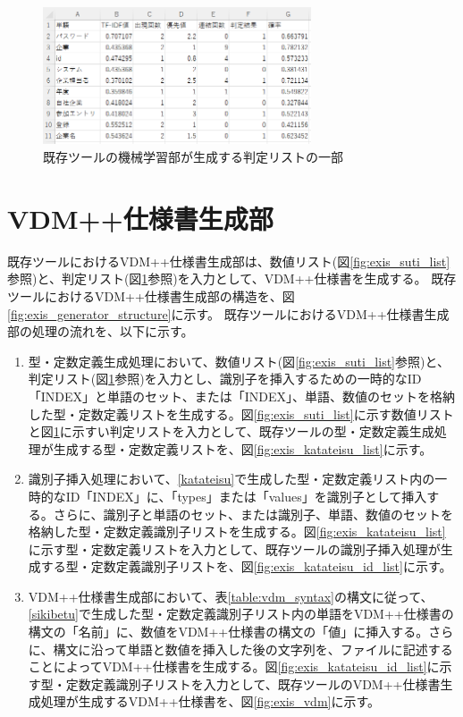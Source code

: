 \begin{figure}[tp]
    \begin{center}
        \includegraphics[width=300]{image/exis_judge_list.png}
        \caption{既存ツールの機械学習部が生成する判定リストの一部}
        \label{fig:exis_judge_list}
    \end{center}
\end{figure}

\section{VDM++仕様書生成部}
既存ツールにおけるVDM++仕様書生成部は、数値リスト(図\ref{fig:exis_suti_list}参照)と、判定リスト(図\ref{fig:exis_judge_list}参照)を入力として、VDM++仕様書を生成する。
既存ツールにおけるVDM++仕様書生成部の構造を、図\ref{fig:exis_generator_structure}に示す。
既存ツールにおけるVDM++仕様書生成部の処理の流れを、以下に示す。

\begin{enumerate}
    \item 型・定数定義生成処理において、数値リスト(図\ref{fig:exis_suti_list}参照)と、判定リスト(図\ref{fig:exis_judge_list}参照)を入力とし、識別子を挿入するための一時的なID「INDEX」と単語のセット、または「INDEX」、単語、数値のセットを格納した型・定数定義リストを生成する。図\ref{fig:exis_suti_list}に示す数値リストと図\ref{fig:exis_judge_list}に示すい判定リストを入力として、既存ツールの型・定数定義生成処理が生成する型・定数定義リストを、図\ref{fig:exis_katateisu_list}に示す。
    \label{katateisu}
    \item 識別子挿入処理において、\ref{katateisu}で生成した型・定数定義リスト内の一時的なID「INDEX」に、「types」または「values」を識別子として挿入する。さらに、識別子と単語のセット、または識別子、単語、数値のセットを格納した型・定数定義識別子リストを生成する。図\ref{fig:exis_katateisu_list}に示す型・定数定義リストを入力として、既存ツールの識別子挿入処理が生成する型・定数定義識別子リストを、図\ref{fig:exis_katateisu_id_list}に示す。
    \label{sikibetu}
    \item VDM++仕様書生成部において、表\ref{table:vdm_syntax}の構文に従って、\ref{sikibetu}で生成した型・定数定義識別子リスト内の単語をVDM++仕様書の構文の「名前」に、数値をVDM++仕様書の構文の「値」に挿入する。さらに、構文に沿って単語と数値を挿入した後の文字列を、ファイルに記述することによってVDM++仕様書を生成する。図\ref{fig:exis_katateisu_id_list}に示す型・定数定義識別子リストを入力として、既存ツールのVDM++仕様書生成処理が生成するVDM++仕様書を、図\ref{fig:exis_vdm}に示す。
\end{enumerate}

